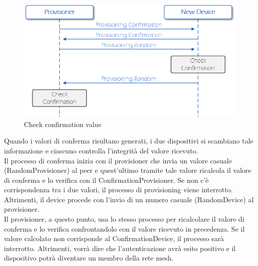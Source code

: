 \begin{figure}[!ht]
    \centering
    \includegraphics[width = \textwidth]{images/Provisioning_confirmation_value_check.png}
    \caption{Check confirmation value}
    \label{fig:provisioning_confirmation_value_check}
\end{figure}

\noindent Quando i valori di conferma risultano generati, i due dispositivi si scambiano tale informazione e ciascuno controlla l'integrità del valore ricevuto.\\
Il processo di conferma inizia con il provisioner che invia un valore casuale (RandomProvisioner) al peer e quest'ultimo tramite tale valore ricalcola il valore di conferma e lo verifica con il ConfirmationProvisioner. Se non c'è corrispondenza tra i due valori, il processo di provisioning viene interrotto. Altrimenti, il device procede con l'invio di un numero casuale (RandomDevice) al provisioner.\\
Il provisioner, a questo punto, usa lo stesso processo per ricalcolare il valore di conferma e lo verifica confrontandolo con il valore ricevuto in precedenza. Se il valore calcolato non corrisponde al ConfirmationDevice, il processo sarà interrotto. Altrimenti, vorrà dire che l'autenticazione avrà esito positivo e il dispositivo potrà diventare un membro della rete mesh.

